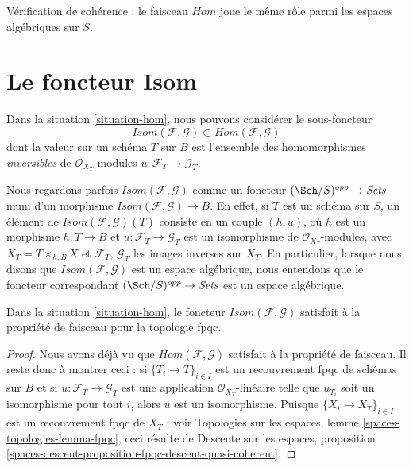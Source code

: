 \noindent
Vérification de cohérence : le faisceau $\mathit{Hom}$ joue le même rôle parmi
les espaces algébriques sur $S$.

\section{Le foncteur Isom}
\label{section-isom}

\noindent
Dans la situation \ref{situation-hom}, nous pouvons considérer le
sous-foncteur
$$
\mathit{Isom}(\mathcal{F}, \mathcal{G}) \subset
\mathit{Hom}(\mathcal{F}, \mathcal{G})
$$
dont la valeur sur un schéma $T$ sur $B$ est l'ensemble des homomorphismes
{\it inversibles} de $\mathcal{O}_{X_T}$-modules
$u : \mathcal{F}_T \to \mathcal{G}_T$.

\medskip\noindent
Nous regardons parfois $\mathit{Isom}(\mathcal{F}, \mathcal{G})$ comme un
foncteur $(\Sch/S)^{opp} \to \textit{Sets}$ muni d'un morphisme
$\mathit{Isom}(\mathcal{F}, \mathcal{G}) \to B$. En effet, si $T$ est un
schéma sur $S$, un élément de
$\mathit{Isom}(\mathcal{F}, \mathcal{G})(T)$ consiste en un couple $(h, u)$,
où $h$ est un morphisme $h : T \to B$ et
$u : \mathcal{F}_T \to \mathcal{G}_T$ est un isomorphisme de
$\mathcal{O}_{X_T}$-modules, avec $X_T = T \times_{h, B} X$ et
$\mathcal{F}_T$, $\mathcal{G}_T$ les images inverses sur $X_T$. En
particulier, lorsque nous disons que
$\mathit{Isom}(\mathcal{F}, \mathcal{G})$ est un espace algébrique, nous
entendons que le foncteur correspondant
$(\Sch/S)^{opp} \to \textit{Sets}$ est un espace algébrique.

\begin{lemma}
\label{lemma-isom-sheaf}
Dans la situation \ref{situation-hom}, le foncteur
$\mathit{Isom}(\mathcal{F}, \mathcal{G})$
satisfait à la propriété de faisceau pour la topologie fpqc.
\end{lemma}

\begin{proof}
Nous avons déjà vu que $\mathit{Hom}(\mathcal{F}, \mathcal{G})$ satisfait à
la propriété de faisceau. Il reste donc à montrer ceci : si
$\{T_i \to T\}_{i \in I}$ est un recouvrement fpqc de schémas sur $B$ et si
$u : \mathcal{F}_T \to \mathcal{G}_T$ est une application
$\mathcal{O}_{X_T}$-linéaire telle que $u_{T_i}$ soit un isomorphisme pour tout
$i$, alors $u$ est un isomorphisme. Puisque
$\{X_i \to X_T\}_{i \in I}$ est un recouvrement fpqc de $X_T$ ; voir
Topologies sur les espaces, lemme \ref{spaces-topologies-lemma-fpqc}, ceci
résulte de Descente sur les espaces, proposition
\ref{spaces-descent-proposition-fpqc-descent-quasi-coherent}.
\end{proof}

